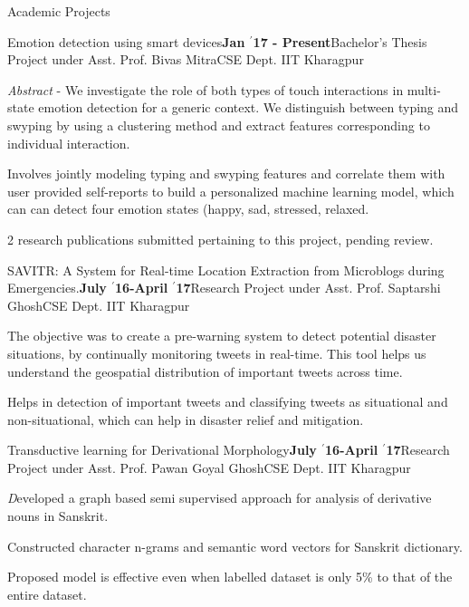 \documentclass{resume} %
\begin{document}
\begin{rSection}{Academic Projects}

\begin{rSubsection}{ \large Emotion detection using smart devices}{\textbf{\large Jan $^{\prime}$17 - Present}}{Bachelor's Thesis Project under Asst. Prof. Bivas Mitra}{CSE Dept. IIT Kharagpur}
\item \textit{Abstract} - We investigate the role of both types of touch interactions in multi-state emotion detection for a generic context. We distinguish between typing and swyping by using a clustering method and extract features corresponding to individual interaction.

\item Involves jointly modeling typing and swyping features and correlate them with user provided self-reports to build a personalized machine learning model, which can can detect four emotion states (happy, sad, stressed, relaxed.

\item 2 research publications submitted pertaining to this project, pending review.
\end{rSubsection}

\begin{rSubsection}{ \large SAVITR: A System for Real-time Location Extraction from Microblogs during Emergencies.}{\textbf{\large July $^{\prime}$16-April $^{\prime}$17}}{Research Project under Asst. Prof. Saptarshi Ghosh}{CSE Dept. IIT Kharagpur}
\item The objective was to create a pre-warning system to detect potential disaster situations, by continually monitoring tweets in real-time. This tool helps us understand the geospatial distribution of important tweets across time.
\item Helps in detection of important tweets and classifying tweets as situational and non-situational, which can help in disaster relief and mitigation.
\end{rSubsection}

\begin{rSubsection}{ \large Transductive learning for Derivational Morphology}{\textbf{\large July $^{\prime}$16-April $^{\prime}$17}}{Research Project under Asst. Prof. Pawan Goyal Ghosh}{CSE Dept. IIT Kharagpur}
\item \textit Developed a graph based semi supervised approach for analysis of derivative nouns in Sanskrit.
\item Constructed character n-grams and semantic word vectors for Sanskrit dictionary. 
\item Proposed model is effective even when labelled dataset is only 5\% to that of the entire dataset.
\end{rSubsection}


\end{rSection}
\end{document}
